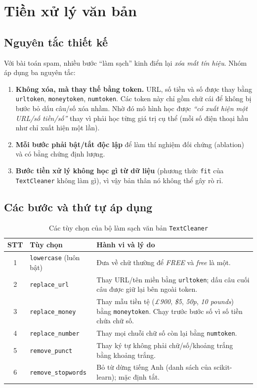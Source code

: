 \section{Tiền xử lý văn bản}
\label{sec:tien-xu-ly}

\subsection{Nguyên tắc thiết kế}

Với bài toán spam, nhiều bước ``làm sạch'' kinh điển lại \textit{xóa mất tín hiệu}. Nhóm áp dụng ba nguyên tắc:

\begin{enumerate}[label=(\arabic*)]
    \item \textbf{Không xóa, mà thay thế bằng token.} URL, số tiền và số được thay bằng \texttt{urltoken}, \texttt{moneytoken}, \texttt{numtoken}. Các token này chỉ gồm chữ cái để không bị bước bỏ dấu câu/số xóa nhầm. Nhờ đó mô hình học được \textit{``có xuất hiện một URL/số tiền/số''} thay vì phải học từng giá trị cụ thể (mỗi số điện thoại hầu như chỉ xuất hiện một lần).
    \item \textbf{Mỗi bước phải bật/tắt độc lập} để làm thí nghiệm đối chứng (ablation) và có bằng chứng định lượng.
    \item \textbf{Bước tiền xử lý không học gì từ dữ liệu} (phương thức \texttt{fit} của \texttt{TextCleaner} không làm gì), vì vậy bản thân nó không thể gây rò rỉ.
\end{enumerate}

\subsection{Các bước và thứ tự áp dụng}

\begin{table}[H]
\centering
\caption{Các tùy chọn của bộ làm sạch văn bản \texttt{TextCleaner}}
\label{tab:cleaner}
\begin{tabular}{|c|p{3.6cm}|p{8.6cm}|}
\hline
\textbf{STT} & \textbf{Tùy chọn} & \textbf{Hành vi và lý do} \\
\hline
1 & \texttt{lowercase} (luôn bật) & Đưa về chữ thường để \textit{FREE} và \textit{free} là một. \\
\hline
2 & \texttt{replace\_url} & Thay URL/tên miền bằng \texttt{urltoken}; dấu câu cuối câu được giữ lại bên ngoài token. \\
\hline
3 & \texttt{replace\_money} & Thay mẫu tiền tệ (\textit{£900}, \textit{\$5}, \textit{50p}, \textit{10 pounds}) bằng \texttt{moneytoken}. Chạy trước bước số vì số tiền chứa chữ số. \\
\hline
4 & \texttt{replace\_number} & Thay mọi chuỗi chữ số còn lại bằng \texttt{numtoken}. \\
\hline
5 & \texttt{remove\_punct} & Thay ký tự không phải chữ/số/khoảng trắng bằng khoảng trắng. \\
\hline
6 & \texttt{remove\_stopwords} & Bỏ từ dừng tiếng Anh (danh sách của scikit-learn); mặc định tắt. \\
\hline
\end{tabular}
\end{table}

